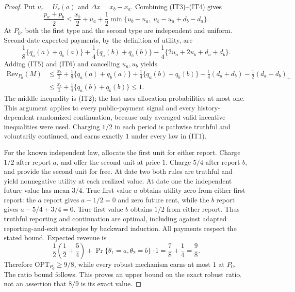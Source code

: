 \documentclass[11pt,a4paper]{article}
\begin{document}
\begin{proof}
Put $u_r=U_r(a)$ and $\Delta x=x_b-x_a$. Combining \textup{(IT3)--(IT4)}
gives
\[
 \frac{p_a+p_b}{2}
 \leq \frac{x_b}{2}+u_a+\frac12
 \min\{u_b-u_a,\ u_b-u_a+d_b-d_a\}.
 \tag{IT5}
\]
At $P_0$, both the first type and the second type are independent and
uniform. Second-date expected payments, by the definition of utility,
are
\[
 \frac18\{q_a(a)+q_b(a)\}
 +\frac14\{q_a(b)+q_b(b)\}
 -\frac14\{2u_a+2u_b+d_a+d_b\}.
 \tag{IT6}
\]
Adding \textup{(IT5)} and \textup{(IT6)} and cancelling $u_a,u_b$ yields
\begin{align*}
 \mathrm{Rev}_{P_0}(M)
 &\leq \frac{x_b}{2}
   +\frac18\{q_a(a)+q_b(a)\}
   +\frac14\{q_a(b)+q_b(b)\}
   -\frac14(d_a+d_b)-\frac12(d_a-d_b)_+\\
 &\leq \frac{x_b}{2}+\frac14\{q_a(b)+q_b(b)\}\leq1.
 \tag{IT7}
\end{align*}
The middle inequality is \textup{(IT2)}; the last uses allocation
probabilities at most one. This argument applies to every public-payment
signal and every history-dependent randomized continuation, because only
averaged valid incentive inequalities were used. Charging $1/2$ in each
period is pathwise truthful and voluntarily continued, and earns exactly
$1$ under every law in \textup{(IT1)}.

For the known independent law, allocate the first unit for either report.
Charge $1/2$ after report $a$, and offer the second unit at price $1$.
Charge $5/4$ after report $b$, and provide the second unit for free.
At date two both rules are truthful and yield nonnegative utility at
each realized value. At date one the independent future value has mean
$3/4$. True first value $a$ obtains utility zero from either first report:
the $a$ report gives $a-1/2=0$ and zero future rent, while the $b$ report
gives $a-5/4+3/4=0$. True first value $b$ obtains $1/2$ from either report.
Thus truthful reporting and continuation are optimal, including against
adapted reporting-and-exit strategies by backward induction. All payments
respect the stated bound. Expected revenue is
\[
 \frac12\left(\frac12+\frac54\right)
 +\Pr\{\theta_1=a,\theta_2=b\}\cdot1
 =\frac78+\frac14=\frac98.
 \tag{IT8}
\]
Therefore $\mathrm{OPT}_{P_0}\geq9/8$, while every robust mechanism earns
at most $1$ at $P_0$. The ratio bound follows. This proves an upper bound
on the exact robust ratio, not an assertion that $8/9$ is its exact value.
\end{proof}
\end{document}
